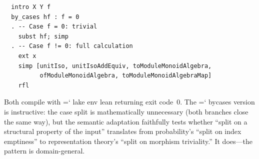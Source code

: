 \documentclass[11pt]{article}
\renewcommand{\texttt}[1]{%
  \begingroup\ttfamily\hyphenchar\font=`\-\relax
  \def\_{\textunderscore\discretionary{}{}{}}%
  #1\endgroup}
\theoremstyle{definition}
\theoremstyle{remark}
\begin{document}
\begin{lstlisting}
  intro X Y f
  by_cases hf : f = 0
  . -- Case f = 0: trivial
    subst hf; simp
  . -- Case f != 0: full calculation
    ext x
    simp [unitIso, unitIsoAddEquiv, toModuleMonoidAlgebra,
          ofModuleMonoidAlgebra, toModuleMonoidAlgebraMap]
    rfl
\end{lstlisting}

Both compile with \texttt{lake env lean} returning exit code~0.
The \texttt{by\_cases} version is instructive: the case split is
mathematically unnecessary (both branches close the same way), but
the semantic adaptation faithfully tests whether ``split on a
structural property of the input'' translates from probability's
``split on index emptiness'' to representation theory's ``split on
morphism triviality.''  It does---the pattern is domain-general.
\end{document}
